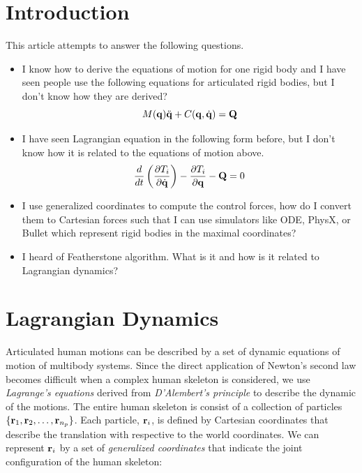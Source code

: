 \section{Introduction}

This article attempts to answer the following questions.

\begin{itemize}
\item I know how to derive the equations of motion for one rigid body
  and I have seen people use the following equations for articulated
  rigid bodies, but I don't know how they are derived?
\begin{equation}
M(\mathbf{q}) \ddot{\mathbf{q}} + C(\mathbf{q}, \dot{\mathbf{q}})  = \mathbf{Q} \nonumber
\end{equation}

\item I have seen Lagrangian equation in the following form before, but I
  don't know how it is related to the equations of motion above.
\begin{equation}\label{eq:lagrangian_dyn}
    \frac{d}{dt} \left( \frac{\partial T_i}{\partial
    \dot{\mathbf{q}}} \right) - \frac{\partial T_i}{\partial
    \mathbf{q}} - \mathbf{Q} = 0 \nonumber
\end{equation}

\item I use generalized coordinates to compute the control forces, how do I convert them to Cartesian forces such that I can use simulators like ODE, PhysX, or Bullet which represent rigid bodies in the maximal coordinates?
\item I heard of Featherstone algorithm. What is it and how is it related to Lagrangian dynamics?
\end{itemize}

\newpage
\section{Lagrangian Dynamics}
\label{sec:lagrangian}
Articulated human motions can be described by a set of dynamic
equations of motion of multibody systems. Since the direct
application of Newton's second law becomes difficult when a
complex human skeleton is considered, we use \emph{Lagrange's
equations} derived from \emph{D'Alembert's principle} to describe
the dynamic of the motions. The entire human skeleton is consist
of a collection of particles $\{\mathbf{r}_1, \mathbf{r}_2,
\ldots, \mathbf{r}_{n_p}\}$.  Each particle,
$\mathbf{r}_i$, is defined by Cartesian coordinates that
describe the translation with respective to the world coordinates.
We can represent $\mathbf{r}_i$ by a set of \emph{generalized
coordinates} that indicate the joint configuration of the human
skeleton:

